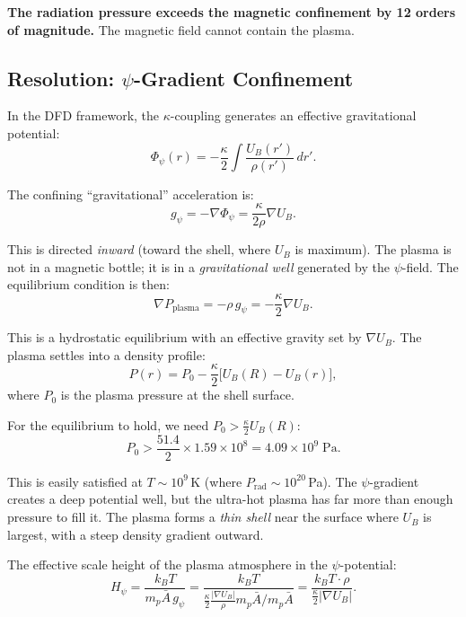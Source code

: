 \documentclass[12pt,a4paper]{article}
\begin{document}
\textbf{The radiation pressure exceeds the magnetic confinement by 12 orders of
magnitude.}  The magnetic field cannot contain the plasma.

\subsection{Resolution: $\psi$-Gradient Confinement}

In the DFD framework, the $\kappa$-coupling generates an effective gravitational
potential:
\begin{equation}
  \Phi_{\psi}(r) = -\frac{\kappa}{2} \int \frac{U_B(r')}{\rho(r')} \, dr'.
\end{equation}

The confining ``gravitational'' acceleration is:
\begin{equation}
  g_{\psi} = -\nabla \Phi_{\psi} = \frac{\kappa}{2\rho} \nabla U_B.
\end{equation}

This is directed \emph{inward} (toward the shell, where $U_B$ is maximum).  The plasma
is not in a magnetic bottle; it is in a \emph{gravitational well} generated by the
$\psi$-field.  The equilibrium condition is then:
\begin{equation}
  \nabla P_{\text{plasma}} = -\rho \, g_{\psi} = -\frac{\kappa}{2} \nabla U_B.
  \label{eq:psi_equilibrium}
\end{equation}

This is a hydrostatic equilibrium with an effective gravity set by $\nabla U_B$.  The
plasma settles into a density profile:
\begin{equation}
  P(r) = P_0 - \frac{\kappa}{2}\big[U_B(R) - U_B(r)\big],
\end{equation}
where $P_0$ is the plasma pressure at the shell surface.

For the equilibrium to hold, we need $P_0 > \frac{\kappa}{2} U_B(R)$:
\begin{equation}
  P_0 > \frac{51.4}{2} \times 1.59\times10^8 = 4.09 \times 10^9 \; \text{Pa}.
\end{equation}

This is easily satisfied at $T \sim 10^9$\,K (where $P_{\text{rad}} \sim 10^{20}$\,Pa).
The $\psi$-gradient creates a deep potential well, but the ultra-hot plasma has far more
than enough pressure to fill it.  The plasma forms a \emph{thin shell} near the surface
where $U_B$ is largest, with a steep density gradient outward.

The effective scale height of the plasma atmosphere in the $\psi$-potential:
\begin{equation}
  H_{\psi} = \frac{k_B T}{m_p \bar{A} \, g_{\psi}}
    = \frac{k_B T}{\frac{\kappa}{2} \frac{|\nabla U_B|}{\rho} m_p \bar{A} / m_p \bar{A}}
    = \frac{k_B T \cdot \rho}{\frac{\kappa}{2} |\nabla U_B|}.
\end{equation}
\end{document}
